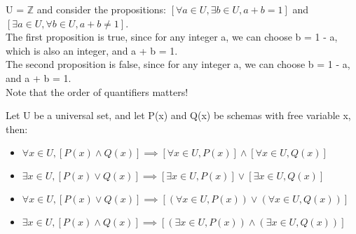 \begin{example}
  U = $\mathbb{Z}$ and consider the propositions: $[\forall a \in U, \exists b \in U, a + b = 1]$ and $[\exists a \in U, \forall b \in U, a + b \neq 1]$.
  \\
  The first proposition is true, since for any integer a, we can choose b = 1 - a, which is also an integer, and a + b = 1.
  \\
  The second proposition is false, since for any integer a, we can choose b = 1 - a, and a + b = 1.
  \\
  Note that the order of quantifiers matters!
\end{example}
\begin{prop}
  Let U be a universal set, and let P(x) and Q(x) be schemas with free variable x, then:
  \begin{itemize}
    \item $\forall x \in U, [P(x) \land Q(x)] \implies [\forall x \in U, P(x)] \land [\forall x \in U, Q(x)]$
    \item $\exists x \in U, [P(x) \lor Q(x)] \implies [\exists x \in U, P(x)] \lor [\exists x \in U, Q(x)]$
    \item $\forall x \in U, [P(x) \lor Q(x)] \implies [(\forall x \in U, P(x)) \lor (\forall x \in U, Q(x))]$
    \item $\exists x \in U, [P(x) \land Q(x)] \implies [(\exists x \in U, P(x)) \land (\exists x \in U, Q(x))]$
  \end{itemize}
\end{prop}